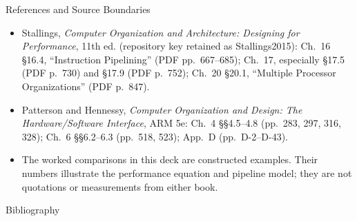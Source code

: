 \documentclass[aspectratio=169]{beamer}
\begin{document}
\begin{frame}{References and Source Boundaries}
  \small
  \begin{itemize}
    \item Stallings, \emph{Computer Organization and Architecture: Designing
      for Performance}, 11th ed. (repository key retained as Stallings2015):
      Ch.~16 §16.4, ``Instruction Pipelining'' (PDF pp.~667--685); Ch.~17,
      especially §17.5 (PDF p.~730) and §17.9 (PDF p.~752); Ch.~20 §20.1,
      ``Multiple Processor Organizations'' (PDF p.~847).
    \item Patterson and Hennessy, \emph{Computer Organization and Design:
      The Hardware/Software Interface}, ARM 5e: Ch.~4 §§4.5--4.8
      (pp.~283, 297, 316, 328); Ch.~6 §§6.2--6.3 (pp.~518, 523); App.~D
      (pp.~D-2--D-43).
    \item The worked comparisons in this deck are constructed examples. Their
      numbers illustrate the performance equation and pipeline model; they are
      not quotations or measurements from either book.
  \end{itemize}
\end{frame}

\begin{frame}[allowframebreaks]{Bibliography}
  
  
\end{frame}
\end{document}
